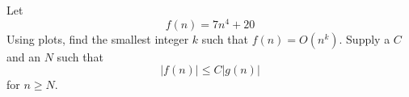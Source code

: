 Let
\[
f(n) = 7n^{4} + 20 
\]
Using plots, find the smallest integer $k$ such that $f(n) = O(n^k)$.
Supply a $C$ and an $N$ such that 
\[
|f(n)| \leq C |g(n)|
\]
for $n \geq N$.
